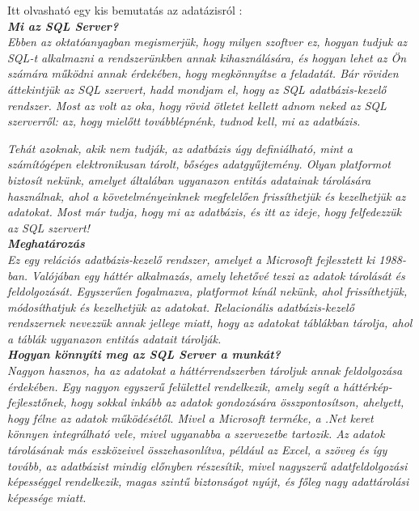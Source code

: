 Itt olvasható egy kis bemutatás az adatázisról \cite{mssqlcikk}:\\

\noindent\textit{\textbf{\large{Mi az SQL Server?}}}\\

\textit{Ebben az oktatóanyagban megismerjük, hogy milyen szoftver ez, hogyan tudjuk az SQL-t alkalmazni a rendszerünkben annak kihasználására, és hogyan lehet az Ön számára működni annak érdekében, hogy megkönnyítse a feladatát. Bár röviden áttekintjük az SQL szervert, hadd mondjam el, hogy az SQL adatbázis-kezelő rendszer. Most az volt az oka, hogy rövid ötletet kellett adnom neked az SQL szerverről: az, hogy mielőtt továbblépnénk, tudnod kell, mi az adatbázis.}

\textit{Tehát azoknak, akik nem tudják, az adatbázis úgy definiálható, mint a számítógépen elektronikusan tárolt, bőséges adatgyűjtemény. Olyan platformot biztosít nekünk, amelyet általában ugyanazon entitás adatainak tárolására használnak, ahol a követelményeinknek megfelelően frissíthetjük és kezelhetjük az adatokat. Most már tudja, hogy mi az adatbázis, és itt az ideje, hogy felfedezzük az SQL szervert!}\\

\noindent\textit{\textbf{Meghatározás}}\\

\textit{Ez egy relációs adatbázis-kezelő rendszer, amelyet a Microsoft fejlesztett ki 1988-ban. Valójában egy háttér alkalmazás, amely lehetővé teszi az adatok tárolását és feldolgozását. Egyszerűen fogalmazva, platformot kínál nekünk, ahol frissíthetjük, módosíthatjuk és kezelhetjük az adatokat. Relacionális adatbázis-kezelő rendszernek nevezzük annak jellege miatt, hogy az adatokat táblákban tárolja, ahol a táblák ugyanazon entitás adatait tárolják.}\\

\noindent\textit{\textbf{Hogyan könnyíti meg az SQL Server a munkát?}}\\

\textit{Nagyon hasznos, ha az adatokat a háttérrendszerben tároljuk annak feldolgozása érdekében. Egy nagyon egyszerű felülettel rendelkezik, amely segít a háttérkép-fejlesztőnek, hogy sokkal inkább az adatok gondozására összpontosítson, ahelyett, hogy félne az adatok működésétől. Mivel a Microsoft terméke, a .Net keret könnyen integrálható vele, mivel ugyanabba a szervezetbe tartozik. Az adatok tárolásának más eszközeivel összehasonlítva, például az Excel, a szöveg és így tovább, az adatbázist mindig előnyben részesítik, mivel nagyszerű adatfeldolgozási képességgel rendelkezik, magas szintű biztonságot nyújt, és főleg nagy adattárolási képessége miatt.}

